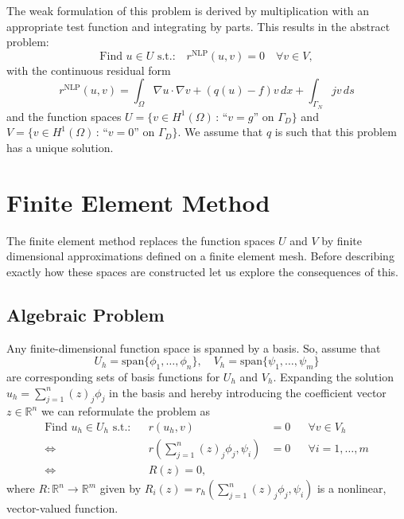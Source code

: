 \documentclass[a4paper,12pt]{article}
\begin{document}
The weak formulation of this problem is derived by multiplication with an appropriate
test function and integrating by parts. This results in the abstract problem:
\begin{equation}
\text{Find $u\in U$ s.t.:} \quad r^{\text{NLP}}(u,v)=0 \quad \forall v\in V,
\label{Eq:BasicBuildingBlock}
\end{equation}
with the continuous residual form
\begin{equation*}
r^{\text{NLP}}(u,v) = \int_\Omega \nabla u \cdot \nabla v + (q(u)-f)v\,dx + \int_{\Gamma_N} jv\,ds
\label{eq:ResidualForm}
\end{equation*}
and the function spaces
$U= \{v\in H^1(\Omega) \,:\, \text{``$v=g$'' on $\Gamma_D$}\}$
and $V= \{v\in H^1(\Omega) \,:\, \text{``$v=0$'' on $\Gamma_D$}\}$.
We assume that $q$ is such that this problem has a unique solution.

\section{Finite Element Method}

The finite element method \cite{WHElliptisch,Brenner,Eriksson,Ciarlet,Braess,Ern,Elman2005}
replaces the function spaces $U$ and $V$ by
finite dimensional approximations defined on a finite element mesh.
Before describing exactly how these spaces are constructed let us
explore the consequences of this.

\subsection{Algebraic Problem}

Any finite-dimensional function space is spanned by a basis. So, assume that
\begin{equation*}
U_h=\text{span}\{\phi_1,\ldots,\phi_n\}, \quad V_h=\text{span}\{\psi_1,\ldots,\psi_m\}
\end{equation*}
are corresponding sets of basis functions for $U_h$ and $V_h$.
Expanding the solution $u_h=\sum_{j=1}^n (z)_j\phi_j$ in the basis and
hereby introducing the coefficient vector $z\in\mathbb{R}^n$ we can
reformulate the problem as
\begin{align*}
\text{Find $u_h\in U_h$ s.t.:} && r(u_h,v)&=0 && \forall v\in V_h\\
\Leftrightarrow{} && r\left(\sum_{j=1}^n (z)_j\phi_j,\psi_i\right) &= 0 &&\forall i=1,\ldots,m\\
\Leftrightarrow{} && R(z) = 0,
\end{align*}
where $R: \mathbb{R}^n \to \mathbb{R}^m$ given by
$R_i(z) = r_h\left(\sum_{j=1}^n (z)_j\phi_j,\psi_i\right)$ is a nonlinear, vector-valued function.
\end{document}
